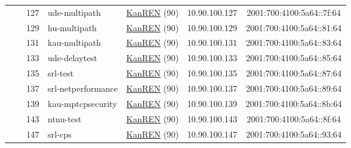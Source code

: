 \begin{small}
\begin{center}
\begin{longtable}{|c|c|c|c|c|c|c|c|}
  &  & \tiny{127} & \multicolumn{1}{|l|}{\tiny{ude-multipath}} & \multicolumn{2}{|c|}{\tiny{\href{http://www.kanren.net}{KanREN} (90)}} & \tiny{10.90.100.127} & \tiny{2001:700:4100:5a64::7f:64} \\* \cline{3-3}\cline{4-4}\cline{5-5}\cline{6-6}\cline{7-7}\cline{8-8}
  &  & \tiny{129} & \multicolumn{1}{|l|}{\tiny{hu-multipath}} & \multicolumn{2}{|c|}{\tiny{\href{http://www.kanren.net}{KanREN} (90)}} & \tiny{10.90.100.129} & \tiny{2001:700:4100:5a64::81:64} \\* \cline{3-3}\cline{4-4}\cline{5-5}\cline{6-6}\cline{7-7}\cline{8-8}
  &  & \tiny{131} & \multicolumn{1}{|l|}{\tiny{kau-multipath}} & \multicolumn{2}{|c|}{\tiny{\href{http://www.kanren.net}{KanREN} (90)}} & \tiny{10.90.100.131} & \tiny{2001:700:4100:5a64::83:64} \\* \cline{3-3}\cline{4-4}\cline{5-5}\cline{6-6}\cline{7-7}\cline{8-8}
  &  & \tiny{133} & \multicolumn{1}{|l|}{\tiny{ude-delaytest}} & \multicolumn{2}{|c|}{\tiny{\href{http://www.kanren.net}{KanREN} (90)}} & \tiny{10.90.100.133} & \tiny{2001:700:4100:5a64::85:64} \\* \cline{3-3}\cline{4-4}\cline{5-5}\cline{6-6}\cline{7-7}\cline{8-8}
  &  & \tiny{135} & \multicolumn{1}{|l|}{\tiny{srl-test}} & \multicolumn{2}{|c|}{\tiny{\href{http://www.kanren.net}{KanREN} (90)}} & \tiny{10.90.100.135} & \tiny{2001:700:4100:5a64::87:64} \\* \cline{3-3}\cline{4-4}\cline{5-5}\cline{6-6}\cline{7-7}\cline{8-8}
  &  & \tiny{137} & \multicolumn{1}{|l|}{\tiny{srl-netperformance}} & \multicolumn{2}{|c|}{\tiny{\href{http://www.kanren.net}{KanREN} (90)}} & \tiny{10.90.100.137} & \tiny{2001:700:4100:5a64::89:64} \\* \cline{3-3}\cline{4-4}\cline{5-5}\cline{6-6}\cline{7-7}\cline{8-8}
  &  & \tiny{139} & \multicolumn{1}{|l|}{\tiny{kau-mptcpsecurity}} & \multicolumn{2}{|c|}{\tiny{\href{http://www.kanren.net}{KanREN} (90)}} & \tiny{10.90.100.139} & \tiny{2001:700:4100:5a64::8b:64} \\* \cline{3-3}\cline{4-4}\cline{5-5}\cline{6-6}\cline{7-7}\cline{8-8}
  &  & \tiny{143} & \multicolumn{1}{|l|}{\tiny{ntnu-test}} & \multicolumn{2}{|c|}{\tiny{\href{http://www.kanren.net}{KanREN} (90)}} & \tiny{10.90.100.143} & \tiny{2001:700:4100:5a64::8f:64} \\* \cline{3-3}\cline{4-4}\cline{5-5}\cline{6-6}\cline{7-7}\cline{8-8}
  &  & \tiny{147} & \multicolumn{1}{|l|}{\tiny{srl-cps}} & \multicolumn{2}{|c|}{\tiny{\href{http://www.kanren.net}{KanREN} (90)}} & \tiny{10.90.100.147} & \tiny{2001:700:4100:5a64::93:64} \\* \cline{3-3}\cline{4-4}\cline{5-5}\cline{6-6}\cline{7-7}\cline{8-8}

\end{longtable}
\end{center}
\end{small}
